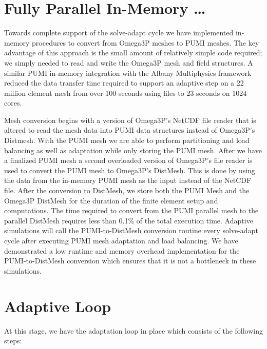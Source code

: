 \documentclass[review,authoryear,12pt]{elsarticle_summary_report}
\begin{document}

\section{Fully Parallel In-Memory \dots}
Towards complete support of the solve-adapt cycle we have implemented in-memory
procedures to convert from Omega3P meshes to PUMI meshes.
The key advantage of this approach is the small amount of relatively simple code
required; we simply needed to read and write the Omega3P mesh and field
structures.
A similar PUMI in-memory integration with the Albany Multiphysics
framework~\cite{salinger2013albany,Albany2015} reduced the data transfer time
required to support an adaptive step on a 22 million element mesh from over 100
seconds using files to 23 seconds on 1024 cores.

Mesh conversion begins with a version of Omega3P's NetCDF file reader that is altered
to read the mesh data into PUMI data structures instead of Omega3P's Distmesh. With 
the PUMI mesh we are able to perform partitioning and load balancing as well as adaptation 
while only storing the PUMI mesh. After we have a finalized PUMI mesh a second 
overloaded version of Omega3P's file reader is used to convert the PUMI mesh to 
Omega3P's DistMesh. This is done by using the data from the in-memory PUMI mesh as the 
input instead of the NetCDF file. After the conversion to DistMesh, we store both the
PUMI Mesh and the Omega3P DistMesh for the duration of the finite element setup and 
computations. The time required to convert from the PUMI parallel mesh to the
parallel DistMesh requires less than 0.1\% of the total execution time.
Adaptive simulations will call the PUMI-to-DistMesh conversion routine every
solve-adapt cycle after executing PUMI mesh adaptation and load balancing.
We have demonstrated a low runtime and memory overhead implementation for the
PUMI-to-DistMesh conversion which ensures that it is not a bottleneck
in these simulations.


\section{Adaptive Loop}
At this stage, we have the adaptation loop in place which consists of the following steps:
\end{document}
